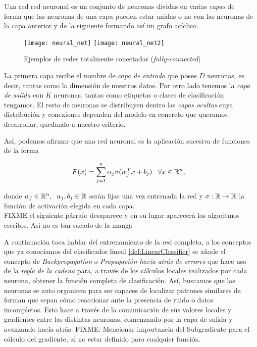 Una red red neuronal es un conjunto de neuronas dividas en varias \emph{capas} de forma que las neuronas de una capa pueden estar unidas o no con las neuronas de la capa anterior y de la siguiente formando así un grafo acíclico.\newline

\begin{figure}[htpb]
  \centering
  \texttt{[image: neural\_net]}
  \vrule
  \texttt{[image: neural\_net2]}
  \caption{Ejemplos de redes totalmente conectadas (\emph{fully-connected}) }
  \label{fig:fully-connected}
\end{figure}

La primera capa recibe el nombre de \emph{capa de entrada} que posee $D$ neuronas, es decir, tantas como la dimensión de nuestros datos. Por otro lado tenemos la \emph{capa de salida} con $K$ neuronas, tantas como etiquetas o clases de clasificación tengamos. El resto de neuronas se distribuyen dentro las \emph{capas ocultas} cuya distribución y conexiones dependen del modelo en concreto que queramos desarrollar, quedando a nuestro criterio.\newline


Así, podemos afirmar que una red neuronal es la aplicación sucesiva de funciones de la forma

$$F(x)=\sum_{j=1}^n \alpha_j \sigma(w_j^Tx+b_j) \;\;\; \forall x \in \mathbb{R}^n,$$

donde $w_j\in\mathbb{R}^n,\;\; \alpha_j,b_j\in\mathbb{R}$ serán fijas una vez entrenada la red y $\sigma : \mathbb{R} \to \mathbb{R}$ la función de activación elegida en cada capa.\\

FIXME el siguiente párrafo desaparece y en su lugar aparecerá los algoritmos escritos. Así no es tan sacado de la manga

A continuación toca hablar del entrenamiento de la red completa, a los conceptos que ya conocíamos del clasificador lineal \ref{def:LinearClassifier} se añade el concepto de \emph{Backpropagation} o \emph{Propagación hacia atrás de errores} que hace uso de la \emph{regla de la cadena} para, a través de los cálculos locales realizados por cada neurona, obtener la función completa de clasificación. Así, buscamos que las neuronas se auto organicen para ser capaces de localizar patrones similares de forman que sepan cómo reaccionar ante la presencia de ruido o datos incompletos. Esto hace a través de la comunicación de sus valores locales y gradientes entre las distintas neuronas, comenzando por la capa de salida y avanzando hacia atrás. FIXME: Mencionar importancia del Subgradiente para el cálculo del gradiente, al no estar definido para cualquier función. \newline

